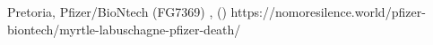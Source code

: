           {
            Pretoria, 
          }
          {
          }
          {
            Pfizer/BioNtech (FG7369)
          }
          {
          }
          {
            ,
             ()
          }
          {
            https://nomoresilence.world/pfizer-biontech/myrtle-labuschagne-pfizer-death/
          }

